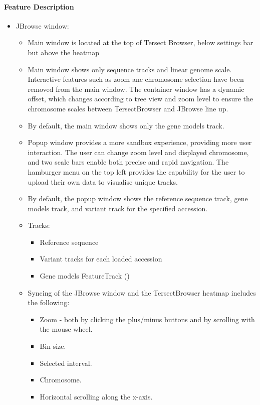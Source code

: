 \documentclass[12pt]{article}
\begin{document}
\paragraph{Feature Description}
\begin{itemize}
    \item JBrowse window:
    \begin{itemize}
        \item Main window is located at the top of Tersect Browser, below settings bar but above the heatmap 
        \item Main window shows only sequence tracks and linear genome scale. Interactive features such as zoom anc chromosome selection have been removed from the main window. The container window has a dynamic offset, which changes according to tree view and zoom level to ensure the chromosome scales between TersectBrowser and JBrowse line up. 
        \item By default, the main window shows only the gene models track.
        \item Popup window provides a more sandbox experience, providing more user interaction. The user can change zoom level and displayed chromosome, and two scale bars enable both precise and rapid navigation. The hamburger menu on the top left provides the capability for the user to upload their own data to visualise unique tracks.
        \item By default, the popup window shows the reference sequence track, gene models track, and variant track for the specified accession.
    \item Tracks:
    \begin{itemize}
        \item Reference sequence 
        \item Variant tracks for each loaded accession
        \item Gene models FeatureTrack ()
    \end{itemize}
    \item Syncing of the JBrowse window and the TersectBrowser heatmap includes the following:
    \begin{itemize}
        \item Zoom - both by clicking the plus/minus buttons and by scrolling with the mouse wheel.
        \item Bin size.
        \item Selected interval.
        \item Chromosome.
        \item Horizontal scrolling along the x-axis.
    \end{itemize}
\end{itemize}
    

\end{itemize}
\end{document}
